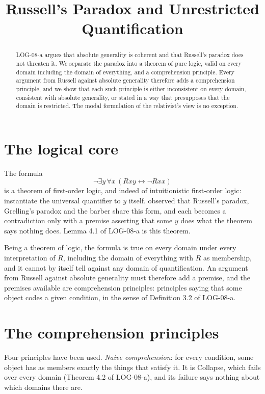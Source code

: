 \documentclass{situationist-preprint}
\title{Russell's Paradox and Unrestricted Quantification}
\begin{document}
\maketitle

\begin{abstract}
LOG-08-a argues that absolute generality is coherent and that Russell's paradox does not threaten it. We separate the paradox into a theorem of pure logic, valid on every domain including the domain of everything, and a comprehension principle. Every argument from Russell against absolute generality therefore adds a comprehension principle, and we show that each such principle is either inconsistent on every domain, consistent with absolute generality, or stated in a way that presupposes that the domain is restricted. The modal formulation of the relativist's view is no exception.
\end{abstract}

\section{The logical core}

The formula
\[
\neg \exists y\, \forall x\, (Rxy \leftrightarrow \neg Rxx)
\]
is a theorem of first-order logic, and indeed of intuitionistic first-order logic: instantiate the universal quantifier to $y$ itself. \citet{Thomson1962} observed that Russell's paradox, Grelling's paradox and the barber share this form, and each becomes a contradiction only with a premise asserting that some $y$ does what the theorem says nothing does. Lemma 4.1 of LOG-08-a is this theorem.

Being a theorem of logic, the formula is true on every domain under every interpretation of $R$, including the domain of everything with $R$ as membership, and it cannot by itself tell against any domain of quantification. An argument from Russell against absolute generality must therefore add a premise, and the premises available are comprehension principles: principles saying that some object codes a given condition, in the sense of Definition 3.2 of LOG-08-a.

\section{The comprehension principles}

Four principles have been used. \emph{Naive comprehension}: for every condition, some object has as members exactly the things that satisfy it. It is Collapse, which fails over every domain (Theorem 4.2 of LOG-08-a), and its failure says nothing about which domains there are.
\end{document}
